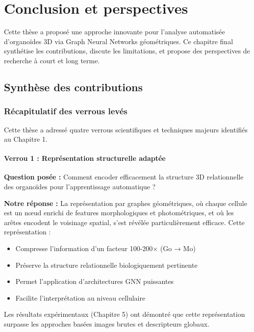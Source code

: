 
\chapter{Conclusion et perspectives}

Cette thèse a proposé une approche innovante pour l'analyse automatisée d'organoïdes 3D via Graph Neural Networks géométriques. Ce chapitre final synthétise les contributions, discute les limitations, et propose des perspectives de recherche à court et long terme.

\section{Synthèse des contributions}

\subsection{Récapitulatif des verrous levés}

Cette thèse a adressé quatre verrous scientifiques et techniques majeurs identifiés au Chapitre 1.

\subsubsection{Verrou 1 : Représentation structurelle adaptée}

\textbf{Question posée :} Comment encoder efficacement la structure 3D relationnelle des organoïdes pour l'apprentissage automatique ?

\textbf{Notre réponse :}
La représentation par graphes géométriques, où chaque cellule est un nœud enrichi de features morphologiques et photométriques, et où les arêtes encodent le voisinage spatial, s'est révélée particulièrement efficace. Cette représentation :
\begin{itemize}
    \item Compresse l'information d'un facteur 100-200× (Go → Mo)
    \item Préserve la structure relationnelle biologiquement pertinente
    \item Permet l'application d'architectures GNN puissantes
    \item Facilite l'interprétation au niveau cellulaire
\end{itemize}

Les résultats expérimentaux (Chapitre 5) ont démontré que cette représentation surpasse les approches basées images brutes et descripteurs globaux.

